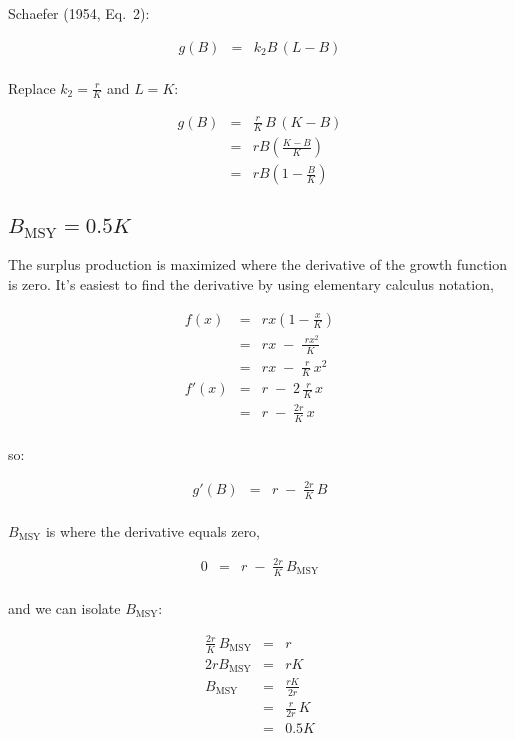 \documentclass[fleqn]{article}
\newcommand{\msy}{_\mathrm{MSY}}
\begin{document}
Schaefer (1954, Eq.~2):

\begin{eqnarray*}
  g(B) &=& k_2B\,(L-B)\\[1ex]
\end{eqnarray*}

Replace $k_2\!=\!\frac{r}{K}$ and $L=K$:

\begin{eqnarray*}
  g(B) &=& \frac{r}{K}\,B\,(K-B)       \\[1em]
  ~    &=& rB\left(\frac{K-B}{K}\right)\\[1em]
  ~    &=& rB\left(1-\frac{B}{K}\right)
\end{eqnarray*}

\newpage

\subsection{$B\msy=0.5K$}

The surplus production is maximized where the derivative of the growth function
is zero. It's easiest to find the derivative by using elementary calculus
notation,

\begin{eqnarray*}
  f(x)  &=& rx\left(1-\frac{x}{K}\right)\\[1em]
  ~     &=& rx \;-\; \frac{\;rx^2}{K}   \\[1em]
  ~     &=& rx \;-\; \frac{\,r}{K}\,x^2 \\[1em]
  f'(x) &=& r \;-\; 2\,\frac{\,r}{K}\,x \\[1em]
  ~     &=& r \;-\; \frac{2r}{K}\,x     \\[1ex]
\end{eqnarray*}

so:

\begin{eqnarray*}
  g'(B) &=& r \;-\; \frac{2r}{K}\,B\\[1ex]
\end{eqnarray*}

$B\msy$ is where the derivative equals zero,

\begin{eqnarray*}
  0 &=& r \;-\; \frac{2r}{K}\,B\msy\\[1ex]
\end{eqnarray*}

and we can isolate $B\msy$:

\begin{eqnarray*}
  \frac{2r}{K}\,B\msy &=& r            \\[1em]
  2rB\msy             &=& rK           \\[1em]
  B\msy               &=& \frac{rK}{2r}\\[1em]
  &=& \frac{r}{2r}\,K                  \\[1em]
  &=& 0.5K
\end{eqnarray*}
\end{document}
